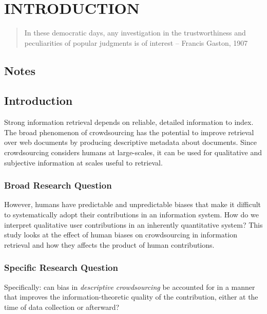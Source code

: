\chapter{INTRODUCTION}\label{introduction}

\begin{quote}
In these democratic days, any investigation in the trustworthiness and
peculiarities of popular judgments is of interest -- Francis Gaston,
1907
\end{quote}

\section{Notes}\label{notes}

\section{Introduction}\label{introduction-1}

Strong information retrieval depends on reliable, detailed information
to index. The broad phenomenon of crowdsourcing has the potential to
improve retrieval over web documents by producing descriptive metadata
about documents. Since crowdsourcing considers humans at large-scales,
it can be used for qualitative and subjective information at scales
useful to retrieval.

\subsection{Broad Research Question}\label{broad-research-question}

However, humans have predictable and unpredictable biases that make it
difficult to systematically adopt their contributions in an information
system. How do we interpret qualitative user contributions in an
inherently quantitative system? This study looks at the effect of human
biases on crowdsourcing in information retrieval and how they affects
the product of human contributions.

\subsection{Specific Research
Question}\label{specific-research-question}

Specifically: can bias in \emph{descriptive crowdsourcing} be accounted
for in a manner that improves the information-theoretic quality of the
contribution, either at the time of data collection or afterward?

